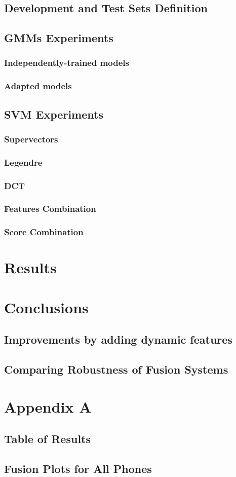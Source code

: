 \documentclass[11pt,a4paper]{tesis}
\begin{document}
	\section{Development and Test Sets Definition}
	\section{GMMs Experiments}
		\subsection{Independently-trained models}
		\subsection{Adapted models}
	\section{SVM Experiments}
		\subsection{Supervectors}
		\subsection{Legendre}
			
		\subsection{DCT}
		\subsection{Features Combination}
		\subsection{Score Combination}

\chapter{Results}
	

\chapter{Conclusions}
	\section{Improvements by adding dynamic features}
	\section{Comparing Robustness of Fusion Systems}

\chapter{Appendix A}
	\section{Table of Results}
	\section{Fusion Plots for All Phones}

\printbibliography
 
\end{document}
